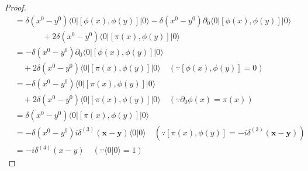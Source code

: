 \documentclass[a4paper,12pt]{article}
\begin{document}
\begin{proof}
\begin{align*}
  &= \delta(x^0 - y^0) \langle 0 | [\phi(x), \phi(y)] | 0 \rangle - \delta(x^0 - y^0) \partial_0\langle 0 | [\phi(x), \phi(y)] | 0 \rangle\\
  &\quad \hspace{1cm} + 2 \delta(x^0 - y^0) \langle 0 | [\pi(x), \phi(y)] | 0 \rangle \tag{2-4.i20}\\
  &= - \delta(x^0 - y^0) \partial_0\langle 0 | [\phi(x), \phi(y)] | 0 \rangle\\
  &\quad + 2 \delta(x^0 - y^0) \langle 0 | [\pi(x), \phi(y)] | 0 \rangle \quad(\because [\phi(x), \phi(y)] = 0)\tag{2-4.i21}\\
  &= - \delta(x^0 - y^0) \langle 0 | [\pi(x), \phi(y)] | 0 \rangle \\
  &\quad + 2 \delta(x^0 - y^0) \langle 0 | [\pi(x), \phi(y)] | 0 \rangle \quad(\because \partial_0 \phi(x) = \pi(x)) \tag{2-4.i22}\\
  &= \delta(x^0 - y^0) \langle 0 | [\pi(x), \phi(y)] | 0 \rangle \tag{2-4.i23}\\
  &= -\delta(x^0 - y^0) i\delta^{(3)}(\mathbf{x} - \mathbf{y}) \langle 0 | 0 \rangle \quad(\because [\pi(x), \phi(y)] = -i\delta^{(3)}(\mathbf{x} - \mathbf{y})) \tag{2-4.i24}\\
  &= -i\delta^{(4)}(x - y) \quad(\because \langle 0 | 0 \rangle = 1) \tag{2-4.i25}
\end{align*}
\end{proof}
\color{black}
\end{document}
